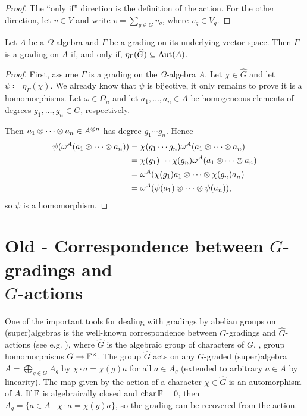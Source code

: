 \begin{proof}
    The ``only if'' direction is the definition of the action. 
    For the other direction, let $v\in V$ and write $v = \sum_{g\in G} v_g$, where $v_g \in V_g$.
\end{proof}

\begin{prop}
    Let $A$ be a $\Omega$-algebra and $\Gamma$ be a grading on its underlying vector space. 
    Then $\Gamma$ is a grading on $A$ if, and only if, $\eta_\Gamma(\widehat G) \subseteq \operatorname{Aut}(A)$.
\end{prop}

\begin{proof}
    First, assume $\Gamma$ is a grading on the $\Omega$-algebra $A$.
    Let $\chi \in \widehat G$ and let $\psi \coloneqq \eta_\Gamma(\chi)$. 
    We already know that $\psi$ is bijective, it only remains to prove it is a homomorphisms. 
    Let $\omega \in \Omega_n$ and let $a_1, \ldots, a_n \in A$ be homogeneous elements of degrees $g_1, \ldots, g_n \in G$, respectively.
    
    Then $a_1\otimes \cdots \otimes a_n \in A^{\otimes n}$ has degree $g_1 \cdots g_n$. Hence
    \begin{align*}
        \psi(\omega^A(a_1\otimes \cdots \otimes a_n)) &= \chi(g_1 \cdots g_n) \omega^A(a_1\otimes \cdots \otimes a_n)\\
        &=\chi(g_1) \cdots \chi(g_n) \omega^A(a_1\otimes \cdots \otimes a_n)\\
        &= \omega^A(\chi(g_1)a_1\otimes \cdots \otimes \chi(g_n)a_n)\\
        &= \omega^A(\psi(a_1)\otimes \cdots \otimes \psi(a_n)),
    \end{align*}
    so $\psi$ is a homomorphism.
\end{proof}



\section{Old - Correspondence between $G$-gradings and\\ $\widehat G$-actions}\label{ssec:G-hat-action}

One of the important tools for dealing with gradings by abelian groups on (super)algebras is the well-known correspondence between  $G$-gradings and $\widehat G$-actions (see e.g. \cite[\S 1.4]{livromicha}), where $\widehat G$ is the algebraic group of characters of $G$, \ie, group homomorphisms $G \rightarrow \mathbb{F}^{\times}$. The group $\widehat{G}$ acts on any $G$-graded (super)algebra $A = \bigoplus_{g\in G} A_g$ by $\chi \cdot a = \chi(g) a$ for all $a\in A_g$ (extended to arbitrary $a\in A$ by linearity). The map given by the action of a character $\chi \in \widehat{G}$ is an automorphism of $A$. If $\mathbb{F}$ is algebraically closed and $\operatorname{char} \mathbb{F} = 0$, then $A_g = \{ a\in A \mid \chi \cdot a = \chi (g) a\}$, so the grading can be recovered from the action.


